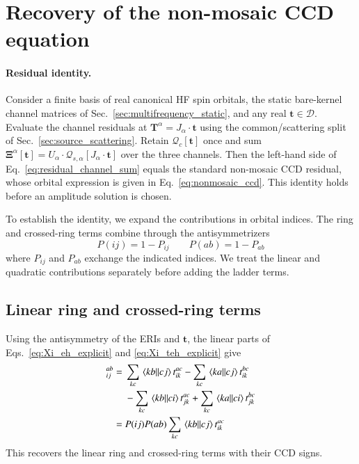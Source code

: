 \documentclass[aip,jcp,reprint,noshowkeys,superscriptaddress]{revtex4-1}
\newcommand{\eh}{\text{eh}}
\newcommand{\teh}{{\overline{\text{eh}}}}
\newcommand{\bt}{\boldsymbol{t}}
\newcommand{\bT}{\boldsymbol{T}}
\newcommand{\bXi}{\boldsymbol{\Xi}}
\newcommand{\bchi}{\boldsymbol{\chi}}
\newcommand{\bcalQ}{\boldsymbol{\mathcal{Q}}}
\begin{document}
\section{Recovery of the non-mosaic CCD equation}
\label{sec:ccd_recovery}

\paragraph{Residual identity.}
Consider a finite basis of real canonical HF spin orbitals, the static
bare-kernel channel matrices of Sec.~\ref{sec:multifrequency_static}, and any
real $\bt\in\mathscr D$. Evaluate the channel residuals at
$\bT^{\alpha}=J_{\alpha}\cdot\bt$ using the common/scattering split of
Sec.~\ref{sec:source_scattering}. Retain $\bcalQ_c[\bt]$ once and sum
$\bXi^{\alpha}[\bt]=U_{\alpha}\cdot\bcalQ_{s,\alpha}[J_{\alpha}\cdot\bt]$ over the three channels.
Then the left-hand side of Eq.~\eqref{eq:residual_channel_sum} equals the
standard non-mosaic CCD residual, whose orbital expression is given in
Eq.~\eqref{eq:nonmosaic_ccd}. This identity holds before an amplitude
solution is chosen.

To establish the identity, we expand the contributions in orbital indices.
The ring and crossed-ring terms combine through the antisymmetrizers
\begin{equation}
    P(ij)=1-P_{ij}
    \qquad
    P(ab)=1-P_{ab}
    \label{eq:permutation_operators}
\end{equation}
where $P_{ij}$ and $P_{ab}$ exchange the indicated indices. We treat the
linear and quadratic contributions separately before adding the ladder terms.

\subsection{Linear ring and crossed-ring terms}

Using the antisymmetry of the ERIs and $\bt$, the linear parts of
Eqs.~\eqref{eq:Xi_eh_explicit} and \eqref{eq:Xi_teh_explicit} give
\begin{align}
    [\bchi^{\eh}_{\rm lin}+\bchi^{\teh}_{\rm lin}]_{ij}^{ab}
    ={}&
    \sum_{kc}\mel{kb}{}{cj}t_{ik}^{ac}
    -\sum_{kc}\mel{ka}{}{cj}t_{ik}^{bc}
    \nonumber\\
    &-
    \sum_{kc}\mel{kb}{}{ci}t_{jk}^{ac}
    +\sum_{kc}\mel{ka}{}{ci}t_{jk}^{bc}
    \nonumber\\
    ={}&
    P(ij)P(ab)
    \sum_{kc}\mel{kb}{}{cj}t_{ik}^{ac}
    \label{eq:ring_linear_audit}
\end{align}
This recovers the linear ring and crossed-ring terms with their CCD signs.
\end{document}
